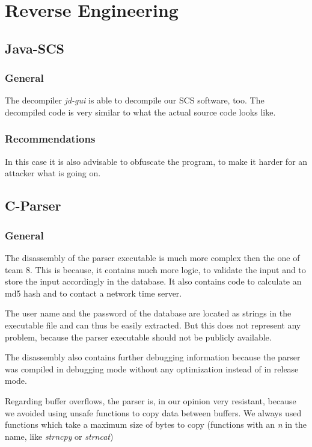 \chapter{Reverse Engineering}

\section{Java-SCS}

\subsection{General}

The decompiler \textit{jd-gui} is able to decompile our SCS software, too. The decompiled code is very similar to what the actual source code looks like. 

\subsection{Recommendations}

In this case it is also advisable to obfuscate the program, to make it harder for an attacker what is going on. 

\section{C-Parser}

\subsection{General}

The disassembly of the parser executable is much more complex then the one of team 8. This is because, it contains much more logic, to validate the input and to store the input accordingly in the database. It also contains code to calculate an md5 hash and to contact a network time server.

The user name and the password of the database are located as strings in the executable file and can thus be easily extracted. But this does not represent any problem, because the parser executable should not be publicly available.

The disassembly also contains further debugging information because the parser was compiled in debugging mode without any optimization instead of in release mode.

Regarding buffer overflows, the parser is, in our opinion very resistant, because we avoided using unsafe functions to copy data between buffers. We always used functions which take a maximum size of bytes to copy (functions with an \textit{n} in the name, like \textit{strncpy} or \textit{strncat})

